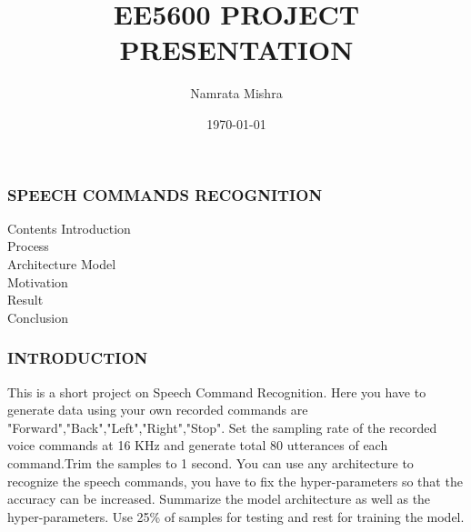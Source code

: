 \documentclass{beamer}
\title{EE5600 PROJECT PRESENTATION}
\author{Namrata Mishra}
\institute{Indian Institute of Technology, Hyderabad}
\date{\today}
\begin{document}
\begin{frame}
\titlepage
\end{frame}
\begin{frame}
\frametitle{SPEECH COMMANDS RECOGNITION}
\tableofcontents
\begin{block}{Contents}
Introduction\\ 
Process \\
Architecture Model\\
Motivation \\
Result\\
Conclusion\\
\end{block}
\end{frame}
\begin{frame}
\frametitle{INTRODUCTION}

This is a short project on Speech Command Recognition.
Here you have to generate data using your own recorded commands are "Forward","Back","Left","Right","Stop". Set the sampling rate of the recorded voice commands at 16 KHz and generate total 80 utterances of each command.Trim the samples to 1 second.
You can use any architecture to recognize the speech commands, you have to fix the hyper-parameters so that the accuracy can be increased. Summarize the model architecture as well as the hyper-parameters.
Use 25\% of samples for testing and rest for training the model.

\end{frame}
\end{document}

